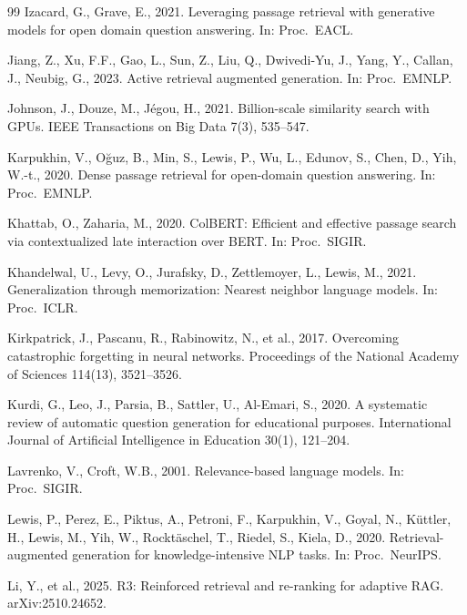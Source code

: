 \documentclass[preprint,12pt]{elsarticle}
\begin{document}
\begin{thebibliography}{99}
Izacard, G., Grave, E., 2021.
Leveraging passage retrieval with generative models for open domain question
answering. In: Proc.\ EACL.

Jiang, Z., Xu, F.F., Gao, L., Sun, Z., Liu, Q., Dwivedi-Yu, J., Yang, Y.,
Callan, J., Neubig, G., 2023.
Active retrieval augmented generation. In: Proc.\ EMNLP.

Johnson, J., Douze, M., J{\'e}gou, H., 2021.
Billion-scale similarity search with GPUs.
IEEE Transactions on Big Data 7(3), 535--547.

Karpukhin, V., O\u{g}uz, B., Min, S., Lewis, P., Wu, L., Edunov, S.,
Chen, D., Yih, W.-t., 2020.
Dense passage retrieval for open-domain question answering.
In: Proc.\ EMNLP.

Khattab, O., Zaharia, M., 2020.
ColBERT: Efficient and effective passage search via contextualized late
interaction over BERT. In: Proc.\ SIGIR.

Khandelwal, U., Levy, O., Jurafsky, D., Zettlemoyer, L., Lewis, M., 2021.
Generalization through memorization: Nearest neighbor language models.
In: Proc.\ ICLR.

Kirkpatrick, J., Pascanu, R., Rabinowitz, N., et al., 2017.
Overcoming catastrophic forgetting in neural networks.
Proceedings of the National Academy of Sciences 114(13), 3521--3526.

Kurdi, G., Leo, J., Parsia, B., Sattler, U., Al-Emari, S., 2020.
A systematic review of automatic question generation for educational purposes.
International Journal of Artificial Intelligence in Education 30(1), 121--204.

Lavrenko, V., Croft, W.B., 2001.
Relevance-based language models. In: Proc.\ SIGIR.

Lewis, P., Perez, E., Piktus, A., Petroni, F., Karpukhin, V., Goyal, N.,
K\"{u}ttler, H., Lewis, M., Yih, W., Rockt\"{a}schel, T., Riedel, S.,
Kiela, D., 2020.
Retrieval-augmented generation for knowledge-intensive NLP tasks.
In: Proc.\ NeurIPS.

Li, Y., et al., 2025.
R3: Reinforced retrieval and re-ranking for adaptive RAG.
arXiv:2510.24652.


\end{thebibliography}
\end{document}
